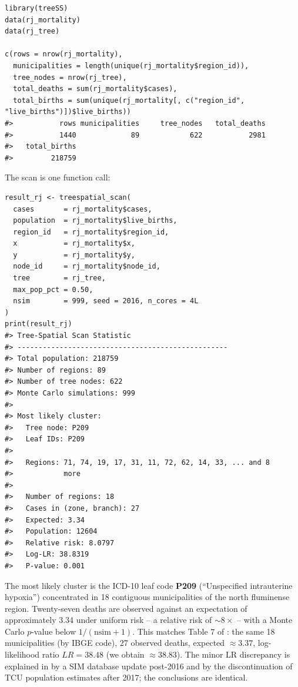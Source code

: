 \begin{verbatim}
library(treeSS)
data(rj_mortality)
data(rj_tree)

c(rows = nrow(rj_mortality),
  municipalities = length(unique(rj_mortality$region_id)),
  tree_nodes = nrow(rj_tree),
  total_deaths = sum(rj_mortality$cases),
  total_births = sum(unique(rj_mortality[, c("region_id", "live_births")])$live_births))
#>           rows municipalities     tree_nodes   total_deaths 
#>           1440             89            622           2981 
#>   total_births 
#>         218759
\end{verbatim}

The scan is one function call:

\begin{verbatim}
result_rj <- treespatial_scan(
  cases       = rj_mortality$cases,
  population  = rj_mortality$live_births,
  region_id   = rj_mortality$region_id,
  x           = rj_mortality$x,
  y           = rj_mortality$y,
  node_id     = rj_mortality$node_id,
  tree        = rj_tree,
  max_pop_pct = 0.50,
  nsim        = 999, seed = 2016, n_cores = 4L
)
print(result_rj)
#> Tree-Spatial Scan Statistic
#> -------------------------------------------------- 
#> Total population: 218759 
#> Number of regions: 89 
#> Number of tree nodes: 622 
#> Monte Carlo simulations: 999 
#> 
#> Most likely cluster:
#>   Tree node: P209 
#>   Leaf IDs: P209
#> 
#>   Regions: 71, 74, 19, 17, 31, 11, 72, 62, 14, 33, ... and 8
#>            more
#> 
#>   Number of regions: 18 
#>   Cases in (zone, branch): 27 
#>   Expected: 3.34 
#>   Population: 12604 
#>   Relative risk: 8.0797 
#>   Log-LR: 38.8319 
#>   P-value: 0.001
\end{verbatim}

The most likely cluster is the ICD-10 leaf code \textbf{P209} (``Unspecified
intrauterine hypoxia'') concentrated in 18 contiguous municipalities of
the north fluminense region. Twenty-seven deaths are observed against an
expectation of approximately 3.34 under uniform risk -- a relative risk of
\(\sim 8\times\) -- with a Monte Carlo \(p\)-value below \(1/(\text{nsim}+1)\).
This matches Table 7 of \citet{cancado2025}: the same 18 municipalities (by IBGE
code), 27 observed deaths, expected \(\approx 3.37\), log-likelihood ratio
\(LR = 38.48\) (we obtain \(\approx 38.83\)). The minor LR discrepancy is
explained in \citet{cancado2025} by a SIM database update post-2016 and by the
discontinuation of TCU population estimates after 2017; the conclusions
are identical.

